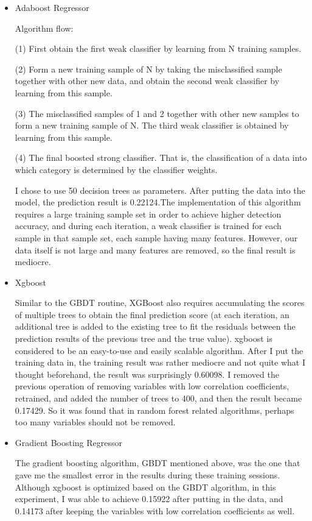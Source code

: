 \documentclass{amsart}
\begin{document}
\begin{itemize}
	\item Adaboost Regressor
	\par Algorithm flow:
	\par (1)	First obtain the first weak classifier by learning from N training samples.
	\par (2)	Form a new training sample of N by taking the misclassified sample together with other new data, and obtain the second weak classifier by learning from this sample.
	\par (3)	The misclassified samples of 1 and 2 together with other new samples to form a new training sample of N. The third weak classifier is obtained by learning from this sample.
	\par (4)	The final boosted strong classifier. That is, the classification of a data into which category is determined by the classifier weights.
	\par I chose to use 50 decision trees as parameters. After putting the data into the model, the prediction result is 0.22124.The implementation of this algorithm requires a large training sample set in order to achieve higher detection accuracy, and during each iteration, a weak classifier is trained for each sample in that sample set, each sample having many features. However, our data itself is not large and many features are removed, so the final result is mediocre.
	\item Xgboost
	\par Similar to the GBDT routine, XGBoost also requires accumulating the scores of multiple trees to obtain the final prediction score (at each iteration, an additional tree is added to the existing tree to fit the residuals between the prediction results of the previous tree and the true value). xgboost is considered to be an easy-to-use and easily scalable algorithm. After I put the training data in, the training result was rather mediocre and not quite what I thought beforehand, the result was surprisingly 0.60098. I removed the previous operation of removing variables with low correlation coefficients, retrained, and added the number of trees to 400, and then the result became 0.17429. So it was found that in random forest related algorithms, perhaps too many variables should not be removed.
	\item Gradient Boosting Regressor
	\par The gradient boosting algorithm, GBDT mentioned above, was the one that gave me the smallest error in the results during these training sessions. Although xgboost is optimized based on the GBDT algorithm, in this experiment, I was able to achieve 0.15922 after putting in the data, and 0.14173 after keeping the variables with low correlation coefficients as well.
	\end{itemize}
\end{document}
